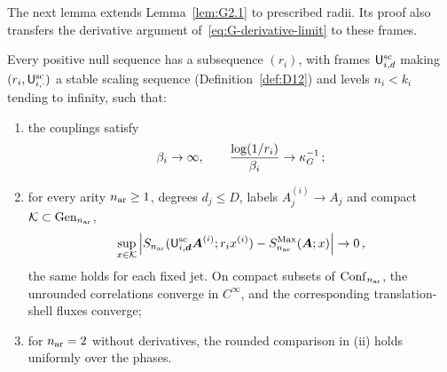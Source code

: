 The next lemma extends Lemma~\ref{lem:G2.1} to prescribed radii. Its proof also transfers the derivative argument of~\eqref{eq:G-derivative-limit} to these frames.
\begin{lemma}\label{lem:I-radii}
Every positive null sequence has a subsequence $(r_i)$, with frames $\mathsf{U}_{i,d}^{\mathrm{sc}}$ making $(r_i,\mathsf{U}_{i,\cdot}^{\mathrm{sc}})$ a stable scaling sequence (Definition~\ref{def:D12}) and levels $n_i<k_i$ tending to infinity, such that:
\begin{enumerate}[label=(\roman*)]
\item the couplings satisfy
\begin{equation}\label{eq:I-adjustable}
\beta_i\to\infty,\qquad \frac{\log(1/r_i)}{\beta_i}\to\kappa_G^{-1}\,;
\end{equation}
\item for every arity $n_{\rm ar}\ge1$, degrees $d_j\le D$, labels $A_j^{(i)}\to A_j$ and compact $\mathcal K\subset\mathrm{Gen}_{n_{\rm ar}}$,
\begin{equation*}
\sup_{x\in \mathcal K}\left|S_{n_{\rm ar}}(\mathsf{U}_{i,\boldsymbol d}^{\mathrm{sc}}\boldsymbol A^{(i)};r_ix^{(i)})-S^{\mathrm{Max}}_{n_{\rm ar}}(\boldsymbol A;x)\right|\to0\,,
\end{equation*}
the same holds for each fixed jet. On compact subsets of $\mathrm{Conf}_{n_{\rm ar}}$, the unrounded correlations converge in $C^\infty$, and the corresponding translation-shell fluxes converge;
\item for $n_{\rm ar}=2$ without derivatives, the rounded comparison in (ii) holds uniformly over the phases.
\end{enumerate}
\end{lemma}
